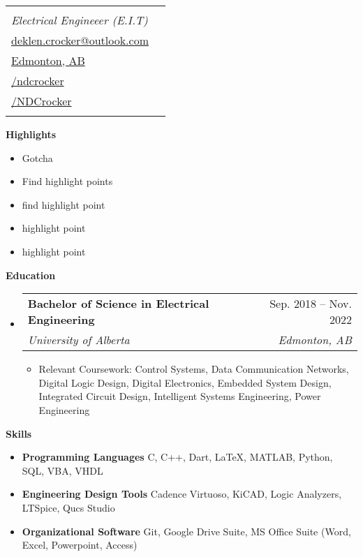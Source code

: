 \documentclass[letterpaper,12pt]{article}[leftmargin=*]
\makeatletter
\def \fullname {Nicolas Deklen Crocker}
\def \subtitle {Electrical Engineeer (E.I.T)}
\def \linkedinicon {\faLinkedin}
\def \linkedinlink {https://linkedin.com/in/ndcrocker/}
\def \linkedintext {/ndcrocker}
\def \phoneicon {\faPhone}
\def \phonetext {+1 (825) 333-4907}
\def \emailicon {\faEnvelope}
\def \emaillink {mailto:deklen.crocker@outlook.com}
\def \emailtext {deklen.crocker@outlook.com}
\def \githubicon {\faGithub}
\def \githublink {https://github.com/NDCrocker}
\def \githubtext {/NDCrocker}
\def \addyicon {\faHome}
\def \addylink {https://goo.gl/maps/KHCJbwCxgCt38gPK7} %
\def \addytext {Edmonton, AB}
\def \headertype {\singlecol} %
\def \entryspacing {-0pt}
\def \linkedin {\linkedinicon \hspace{3pt}\href{\linkedinlink}{\linkedintext}}
\def \phone {\phoneicon \hspace{3pt}{ \phonetext}}
\def \email {\emailicon \hspace{3pt}\href{\emaillink}{\emailtext}}
\def \github {\githubicon \hspace{3pt}\href{\githublink}{\githubtext}}
\def \addy {\addyicon \hspace{3pt}\href{\addylink}{\addytext}}
\renewcommand{\section}[2]{\vspace{5pt}
  \colorbox{secondary}{\color{white}\raggedbottom\normalsize\textbf{{#1}{\hspace{7pt}#2}}}
}
\newcommand{\resumeEntryStart}{\begin{itemize}[leftmargin=2.5mm]}
\newcommand{\resumeEntryEnd}{\end{itemize}\vspace{\entryspacing}}
\newcommand{\resumeItemListStart}{\begin{itemize}[leftmargin=4.5mm]}
\newcommand{\resumeItemListEnd}{\end{itemize}}
\newcommand{\resumeItem}[1]{
  \item\small{
    {#1 \vspace{-2pt}}
  }
}
\newcommand{\resumeEntryTSDL}[4]{
  \vspace{-1pt}\item[]
    \begin{tabularx}{0.97\textwidth}{X@{\hspace{60pt}}r}
      \textbf{\color{primary}#1} & {\firabook\color{accent}\small#2} \\
      \textit{\color{accent}\small#3} & \textit{\color{accent}\small#4} \\
    \end{tabularx}\vspace{-6pt}
}
\newcommand{\resumeEntryS}[2]{
  \item[]\small{
    \textbf{\color{primary}#1 }{ #2 \vspace{-6pt}}
  }
}
\newcommand{\doublecol}[6]{
  \begin{tabularx}{\textwidth}{Xr}
    {
      \begin{tabular}[c]{l}
        \fontsize{35}{45}\selectfont{\color{primary}{{\textbf{\fullname}}}} \\
        {\textit{\subtitle}} %
      \end{tabular}
    } & {
      \begin{tabular}[c]{l@{\hspace{1.5em}}l}
        {\small#4} & {\small#1} \\
        {\small#5} & {\small#2} \\
        {\small#6} & {\small#3}
      \end{tabular}
    }
  \end{tabularx}
}
\newcommand{\singlecol}[6]{
  \begin{tabularx}{\textwidth}{Xr}
    {
      \begin{tabular}[b]{l}
        \fontsize{35}{45}\selectfont{\color{primary}{{\textbf{\fullname}}}} \\
        {\textit{\subtitle}} %
      \end{tabular}
    } & {
      \begin{tabular}[c]{l}
        {\small#1} \\
        {\small#2} \\
        {\small#3} \\
        {\small#4} \\
        {\small#5} \\
        {\small#6}
      \end{tabular}
    }
  \end{tabularx}
}
\makeatother
\begin{document}


\headertype{\phone}{\email}{\addy}{\linkedin}{\github}{} %
\vspace{-20pt} %

\section{}{Highlights}
  \resumeItemListStart
    \resumeItem{Gotcha}
    \resumeItem{Find highlight points}
    \resumeItem{find highlight point}
    \resumeItem{highlight point}
    \resumeItem{highlight point}
  \resumeItemListEnd
\section{\faGraduationCap}{Education}

  \resumeEntryStart
    \resumeEntryTSDL
      {Bachelor of Science in Electrical Engineering}{Sep. 2018 -- Nov. 2022}
      {University of Alberta}{Edmonton, AB}
  \resumeItemListStart
    \resumeItem{Relevant Coursework: Control Systems, Data Communication Networks, Digital Logic Design, Digital Electronics, Embedded System Design, Integrated Circuit Design, Intelligent Systems Engineering, Power Engineering}
  \resumeItemListEnd
  \resumeEntryEnd

\section{\faGears}{Skills}

  \resumeEntryStart
   \resumeEntryS{Programming Languages } {C, C++, Dart, LaTeX, MATLAB, Python, SQL, VBA, VHDL}
   \resumeEntryS{Engineering Design Tools } {Cadence Virtuoso, KiCAD, Logic Analyzers, LTSpice, Qucs Studio}
   \resumeEntryS{Organizational Software } {Git, Google Drive Suite, MS Office Suite (Word, Excel, Powerpoint, Access)}
  \resumeEntryEnd
\end{document}
